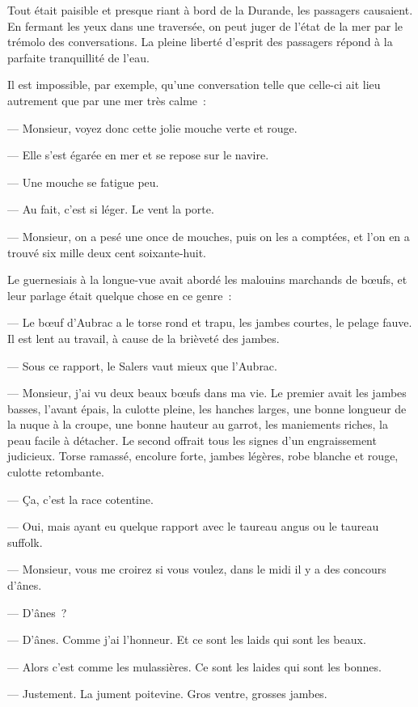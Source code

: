 \documentclass[french,twoside]{book} %
\begin{document}
Tout était paisible et presque riant à bord de la Durande, les passagers causaient. En fermant les yeux dans une traversée, on peut juger de l’état de la mer par le trémolo des conversations. La pleine liberté d’esprit des passagers répond à la parfaite tranquillité de l’eau.\par
Il est impossible, par exemple, qu’une conversation telle que celle-ci ait lieu autrement que par une mer très calme :\par
— Monsieur, voyez donc cette jolie mouche verte et rouge.\par
— Elle s’est égarée en mer et se repose sur le navire.\par
— Une mouche se fatigue peu.\par
— Au fait, c’est si léger. Le vent la porte.\par
— Monsieur, on a pesé une once de mouches, puis on les a comptées, et l’on en a trouvé six mille deux cent soixante-huit.\par
Le guernesiais à la longue-vue avait abordé les malouins marchands de bœufs, et leur parlage était quelque chose en ce genre :\par
 — Le bœuf d’Aubrac a le torse rond et trapu, les jambes courtes, le pelage fauve. Il est lent au travail, à cause de la brièveté des jambes.\par
— Sous ce rapport, le Salers vaut mieux que l’Aubrac.\par
— Monsieur, j’ai vu deux beaux bœufs dans ma vie. Le premier avait les jambes basses, l’avant épais, la culotte pleine, les hanches larges, une bonne longueur de la nuque à la croupe, une bonne hauteur au garrot, les maniements riches, la peau facile à détacher. Le second offrait tous les signes d’un engraissement judicieux. Torse ramassé, encolure forte, jambes légères, robe blanche et rouge, culotte retombante.\par
— Ça, c’est la race cotentine.\par
— Oui, mais ayant eu quelque rapport avec le taureau angus ou le taureau suffolk.\par
— Monsieur, vous me croirez si vous voulez, dans le midi il y a des concours d’ânes.\par
— D’ânes ?\par
— D’ânes. Comme j’ai l’honneur. Et ce sont les laids qui sont les beaux.\par
— Alors c’est comme les mulassières. Ce sont les laides qui sont les bonnes.\par
— Justement. La jument poitevine. Gros ventre, grosses jambes.\par
\end{document}
